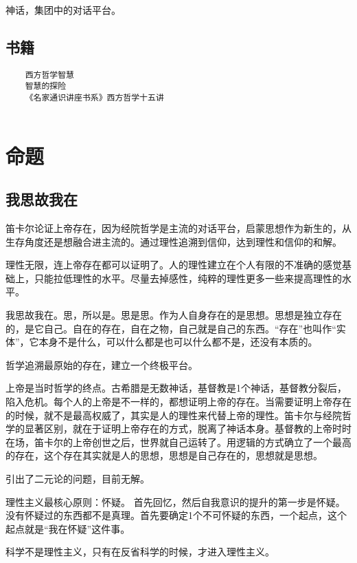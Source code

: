 \documentclass[UTF8]{../RepresentationUniverse}
\begin{document}
神话，集团中的对话平台。


\subsection{书籍}

\begin{lstlisting}
    西方哲学智慧
    智慧的探险
    《名家通识讲座书系》西方哲学十五讲
 
 \end{lstlisting}





\section{命题}

\subsection{我思故我在}

笛卡尔论证上帝存在，因为经院哲学是主流的对话平台，启蒙思想作为新生的，从生存角度还是想融合进主流的。通过理性追溯到信仰，达到理性和信仰的和解。

理性无限，连上帝存在都可以证明了。人的理性建立在个人有限的不准确的感觉基础上，只能拉低理性的水平。尽量去掉感性，纯粹的理性更多一些来提高理性的水平。

我思故我在。思，所以是。思是思。作为人自身存在的是思想。思想是独立存在的，是它自己。自在的存在，自在之物，自己就是自己的东西。“存在”也叫作“实体”，它本身不是什么，可以什么都是也可以什么都不是，还没有本质的。

哲学追溯最原始的存在，建立一个终极平台。

上帝是当时哲学的终点。古希腊是无数神话，基督教是1个神话，基督教分裂后，陷入危机。每个人的上帝是不一样的，都想证明上帝的存在。当需要证明上帝存在的时候，就不是最高权威了，其实是人的理性来代替上帝的理性。笛卡尔与经院哲学的显著区别，就在于证明上帝存在的方式，脱离了神话本身。基督教的上帝时时在场，笛卡尔的上帝创世之后，世界就自己运转了。用逻辑的方式确立了一个最高的存在，这个存在其实就是人的思想，思想是自己存在的，思想就是思想。

引出了二元论的问题，目前无解。

理性主义最核心原则：怀疑。
首先回忆，然后自我意识的提升的第一步是怀疑。没有怀疑过的东西都不是真理。首先要确定1个不可怀疑的东西，一个起点，这个起点就是“我在怀疑”这件事。

科学不是理性主义，只有在反省科学的时候，才进入理性主义。
\end{document}
